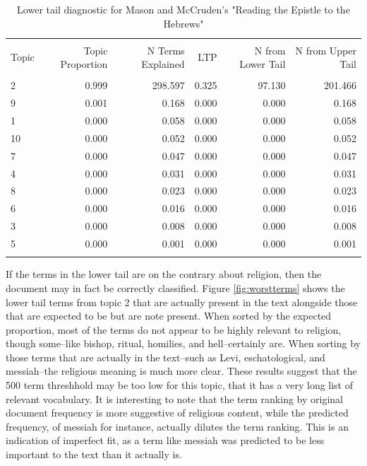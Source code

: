 \documentclass[]{book}
\theoremstyle{definition}
\theoremstyle{definition}
\theoremstyle{definition}
\theoremstyle{remark}
\begin{document}
\begin{table}[!htbp] \centering 
  \caption{Lower tail diagnostic for Mason and McCruden's "Reading the Epistle to the Hebrews"} 
  \label{tab:worstdoc} 
\begin{tabular}{@{\extracolsep{5pt}} lrrrrr} 
\\[-1.8ex]\hline 
\hline \\[-1.8ex] 
Topic & Topic Proportion & N Terms Explained & LTP & N from Lower Tail & N from Upper Tail \\ 
\hline \\[-1.8ex] 
2 & 0.999 & 298.597 & 0.325 & 97.130 & 201.466 \\ 
9 & 0.001 &   0.168 & 0.000 &  0.000 &   0.168 \\ 
1 & 0.000 &   0.058 & 0.000 &  0.000 &   0.058 \\ 
10 & 0.000 &   0.052 & 0.000 &  0.000 &   0.052 \\ 
7 & 0.000 &   0.047 & 0.000 &  0.000 &   0.047 \\ 
4 & 0.000 &   0.031 & 0.000 &  0.000 &   0.031 \\ 
8 & 0.000 &   0.023 & 0.000 &  0.000 &   0.023 \\ 
6 & 0.000 &   0.016 & 0.000 &  0.000 &   0.016 \\ 
3 & 0.000 &   0.008 & 0.000 &  0.000 &   0.008 \\ 
5 & 0.000 &   0.001 & 0.000 &  0.000 &   0.001 \\ 
\hline \\[-1.8ex] 
\end{tabular} 
\end{table}

If the terms in the lower tail are on the contrary about religion, then
the document may in fact be correctly classified. Figure
\ref{fig:worstterms} shows the lower tail terms from topic 2 that are
actually present in the text alongside those that are expected to be but
are note present. When sorted by the expected proportion, most of the
terms do not appear to be highly relevant to religion, though some--like
bishop, ritual, homilies, and hell--certainly are. When sorting by those
terms that are actually in the text--such as Levi, eschatological, and
messiah--the religious meaning is much more clear. These results suggest
that the 500 term threshhold may be too low for this topic, that it has
a very long list of relevant vocabulary. It is interesting to note that
the term ranking by original document frequency is more suggestive of
religious content, while the predicted frequency, of messiah for
instance, actually dilutes the term ranking. This is an indication of
imperfect fit, as a term like messiah was predicted to be less important
to the text than it actually is.
\end{document}
